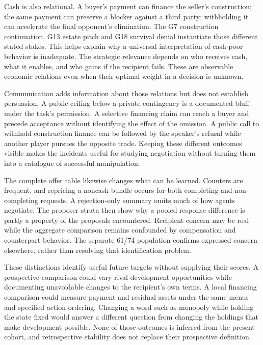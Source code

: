 Cash is also relational. A buyer's payment can finance the seller's construction; the same payment can preserve a blocker against a third party; withholding it can accelerate the final opponent's elimination. The G7 construction continuation, G13 estate pitch and G18 survival denial instantiate those different stated stakes. This helps explain why a universal interpretation of cash-poor behavior is inadequate. The strategic relevance depends on who receives cash, what it enables, and who gains if the recipient fails. These are observable economic relations even when their optimal weight in a decision is unknown.

Communication adds information about those relations but does not establish persuasion. A public ceiling below a private contingency is a documented bluff under the task's permission. A selective financing claim can reach a buyer and precede acceptance without identifying the effect of the omission. A public call to withhold construction finance can be followed by the speaker's refusal while another player pursues the opposite trade. Keeping these different outcomes visible makes the incidents useful for studying negotiation without turning them into a catalogue of successful manipulation.

The complete offer table likewise changes what can be learned. Counters are frequent, and repricing a noncash bundle occurs for both completing and non-completing requests. A rejection-only summary omits much of how agents negotiate. The proposer strata then show why a pooled response difference is partly a property of the proposals encountered. Recipient concern may be real while the aggregate comparison remains confounded by compensation and counterpart behavior. The separate 61/74 population confirms expressed concern elsewhere, rather than resolving that identification problem.

These distinctions identify useful future targets without supplying their scores. A prospective comparison could vary rival development opportunities while documenting unavoidable changes to the recipient's own terms. A local financing comparison could measure payment and residual assets under the same menus and specified action ordering. Changing a word such as monopoly while holding the state fixed would answer a different question from changing the holdings that make development possible. None of those outcomes is inferred from the present cohort, and retrospective stability does not replace their prospective definition.

